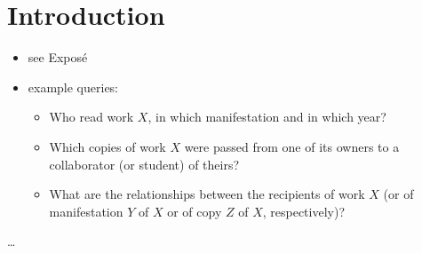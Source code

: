 
\chapter{Introduction}

\begin{itemize}
  \item
    see Exposé
  \item
    example queries:
    \begin{itemize}
      \item
        Who read work $X$, in which manifestation and in which year?
      \item
        Which copies of work $X$ were passed from one of its owners to a collaborator (or student) of theirs?
      \item
        What are the relationships between the recipients of work $X$
        (or of manifestation $Y$ of $X$ or of copy $Z$ of $X$, respectively)?
    \end{itemize}
\end{itemize}

\dots


